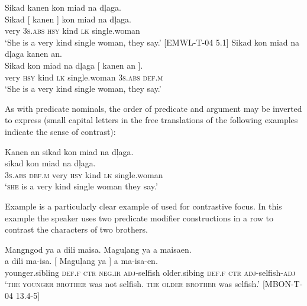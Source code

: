 \ea
\label{bkm:Ref428973688}
Sikad kanen kon  miad  na  dļaga. \\\smallskip
\gll Sikad [ kanen ] kon  miad  na  dļaga. \\
very {} 3\textsc{s.abs} {} \textsc{hsy}  kind  \textsc{lk}  single.woman \\
\glt ‘She is a very kind single woman, they say.’ [EMWL-T-04 5.1]
\z
\ea
\label{bkm:Ref442632390}
Sikad  kon  miad  na  dļaga  kanen  an. \\\smallskip
\gll Sikad  kon  miad  na  dļaga [ kanen  an{ }]. \\
very  \textsc{hsy}  kind  \textsc{lk}  single.woman  {} 3\textsc{s.abs} \textsc{def.m} \\
\glt ‘She is a very kind single woman, they say.’
\z

As with predicate nominals, the order of predicate and argument may be inverted to express  (small capital letters in the free translations of the following examples indicate the sense of contrast):

\ea
Kanen  an  sikad  kon  miad  na  dļaga. \\\smallskip
\gll [ Kanen  an{ }] sikad  kon  miad  na  dļaga. \\
{} 3\textsc{s.abs}  \textsc{def.m} very  \textsc{hsy}  kind  \textsc{lk}  single.woman \\
\glt ‘\textsc{she} is a very kind single woman they say.’
\z

Example  is a particularly clear example of  used for contrastive focus. In this example the speaker uses two predicate modifier constructions in a row to contrast the characters of two brothers.

\ea
\label{bkm:Ref442632516}
Mangngod  ya  a  dili  maisa.  Maguļang  ya  a  maisaen. \\\smallskip
\gll [ Mangngod  ya{ }] a  dili  ma-isa.  [ Maguļang  ya{ } ] a  ma-isa-en.\footnotemark{}  \\
{} younger.sibling  \textsc{def.f} \textsc{ctr}  \textsc{neg.ir}  \textsc{adj}-selfish {} older.sibing  \textsc{def.f} {} \textsc{ctr}  \textsc{adj}-selfish-\textsc{adj} \\
\glt ‘\textsc{the younger brother} was not selfish. \textsc{the older brother} was selfish.’ [MBON-T-04 13.4-5]
\z
